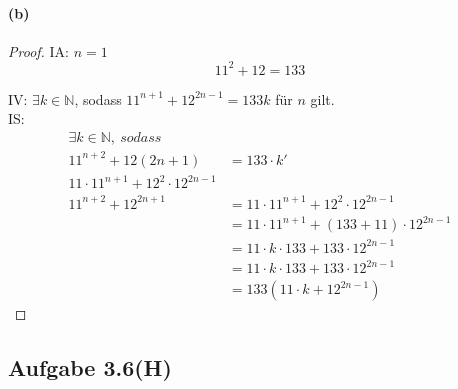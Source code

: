 \paragraph{(b)}
\begin{proof}
IA: $n=1$\\
\begin{equation*}
11^2+12=133
\end{equation*}

IV: $\exists k\in\mathbb{N}$, sodass $11^{n+1}+12^{2n-1}=133k$ für $n$ gilt.\\

IS:
\begin{align*}
\exists k\in\mathbb{N},\ sodass\\
11^{n+2}+12(2n+1)&=133\cdot k'\\
11\cdot 11^{n+1}+12^2\cdot 12^{2n-1}\\
11^{n+2}+12^{2n+1}&=11\cdot 11^{n+1}+12^2\cdot 12^{2n-1}\\
&=11\cdot 11^{n+1}+(133+11)\cdot 12^{2n-1}\\
&=11\cdot k\cdot 133+133\cdot 12^{2n-1}\\
&=11\cdot k\cdot 133+133\cdot 12^{2n-1}\\
&=133(11\cdot k+12^{2n-1})
\end{align*}
\end{proof}

\newpage

\subsection{Aufgabe 3.6(H)}

